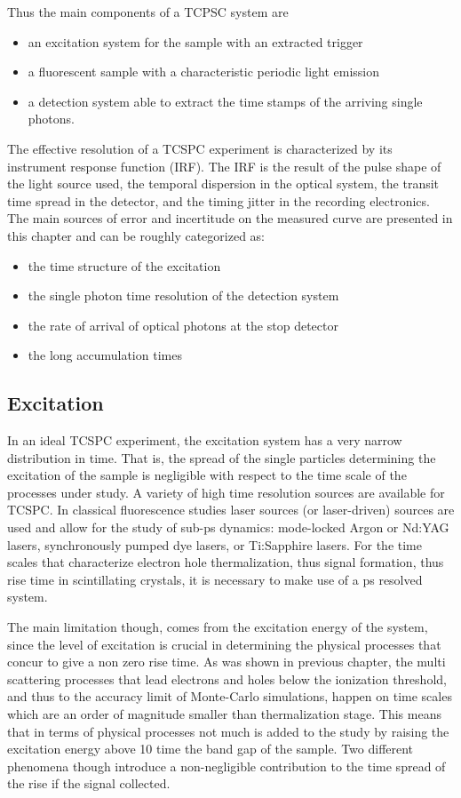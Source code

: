 Thus the main components of a TCPSC system are
\begin{itemize}
\item an excitation system for the sample with an extracted trigger
\item a fluorescent sample with a characteristic periodic light emission
\item a detection system able to extract the time stamps of the arriving single photons.
\end{itemize}
The effective resolution of a TCSPC experiment is characterized by its instrument response function (IRF). The IRF is the result of the pulse shape of the light source used, the temporal dispersion in the optical system, the transit time spread in the detector, and the timing jitter in the recording electronics.
The main sources of error and incertitude on the measured curve are presented in this chapter and can be roughly categorized as:
\begin{itemize}
\item the time structure of the excitation
\item the single photon time resolution of the detection system
\item the rate of arrival of optical photons at the stop detector
\item the long accumulation times
\end{itemize}

\subsection{Excitation}
In an ideal TCSPC experiment, the excitation system has a very narrow distribution in time. That is, the spread of the single particles determining the excitation of the sample is negligible with respect to the time scale of the processes under study.
A variety of high time resolution sources are available for TCSPC. In classical fluorescence studies laser sources (or laser-driven) sources are used and allow for the study of sub-ps dynamics: mode-locked Argon or Nd:YAG lasers, synchronously pumped dye lasers, or Ti:Sapphire lasers.
For the time scales that characterize electron hole thermalization, thus signal formation, thus rise time in scintillating crystals, it is necessary to make use of a ps resolved system.

The main limitation though, comes from the excitation energy of the system, since the level of excitation is crucial in determining the physical processes that concur to give a non zero rise time. 
As was shown in previous chapter, the multi scattering processes that lead electrons and holes below the ionization threshold, and thus to the accuracy limit of Monte-Carlo simulations, happen on time scales which are an order of magnitude smaller than thermalization stage. 
This means that in terms of physical processes not much is added to the study by raising the excitation energy above 10 time the band gap of the sample.
Two different phenomena though introduce a non-negligible contribution to the time spread of the rise if the signal collected.


